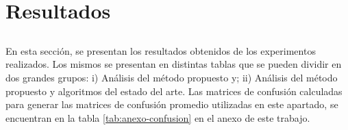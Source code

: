 \chapter*{Resultados}\label{ch:resultados}

\section*{}
\addtocounter{section}{1}
\setcounter{subsection}{0}

En esta sección, se presentan los resultados obtenidos de los experimentos realizados. Los mismos se presentan en distintas tablas que se pueden dividir en dos grandes grupos: i) Análisis del método propuesto y; ii) Análisis del método propuesto y algoritmos del estado del arte. Las matrices de confusión calculadas para generar las matrices de confusión promedio utilizadas en este apartado, se encuentran en la tabla \ref{tab:anexo-confusion} en el anexo de este trabajo.






